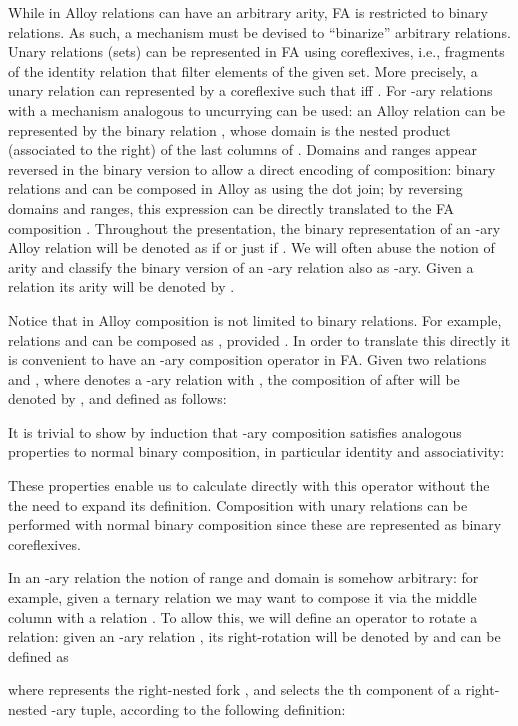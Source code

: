 \documentclass{llncs}
\begin{document}
While in Alloy relations can have an arbitrary arity, FA is restricted to binary relations. As such, a mechanism must be devised to ``binarize'' arbitrary relations. Unary relations (sets) can be represented in FA using coreflexives, i.e., fragments of the identity relation that filter elements of the given set. More precisely, a unary relation  can represented by a coreflexive  such that  iff . For -ary relations with  a mechanism analogous to uncurrying can be used: an Alloy relation  can be represented by the binary relation , whose domain is the nested product (associated to the right) of the last  columns of . Domains and ranges appear reversed in the binary version to allow a direct encoding of composition: binary relations  and  can be composed in Alloy as  using the dot join; by reversing domains and ranges, this expression can be directly translated to the FA composition . Throughout the presentation, the binary representation of an -ary Alloy relation  will be denoted as  if  or just  if .  We will often abuse the notion of arity and classify the binary version of an -ary relation also as -ary. Given a relation  its arity will be denoted by .

Notice that in Alloy composition is not limited to binary relations. For example, relations  and  can be composed as , provided . In order to translate this directly it is convenient to have an -ary composition operator in FA. Given two relations  and , where  denotes a -ary relation with , the composition of  after  will be denoted by , and defined as follows:

It is trivial to show by induction that -ary composition satisfies analogous properties to normal binary composition, in particular identity and associativity: 

These properties enable us to calculate directly with this operator without the the need to expand its definition. Composition with unary relations can be performed with normal binary composition since these are represented as binary coreflexives.

\newcommand{\rotate}[1]{\overrightarrow{#1}}
\newcommand{\nrotate}[2]{\overset{#2 \rightarrow}{#1}}
In an -ary relation the notion of range and domain is somehow arbitrary: for example, given a ternary relation  we may want to compose it via the middle column with a relation . To allow this, we will define an operator to rotate a relation: given an -ary relation , its right-rotation will be denoted by  and can be defined as

where  represents the right-nested fork
, and  selects the th component of a right-nested -ary tuple, according to the following definition:
 
\end{document}

